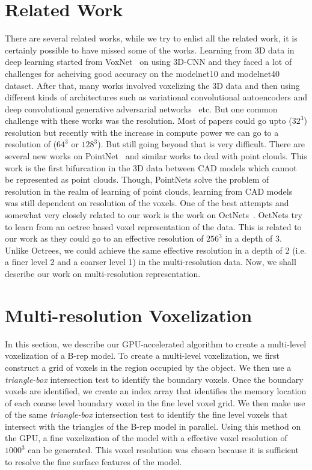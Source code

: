 \documentclass[10pt,letterpaper]{article}
\begin{document}
\section{Related Work}
\label{Sec:RelatedWork}

There are several related works, while we try to enlist all the related work, it is certainly possible to have missed some of the works. Learning from 3D data in deep learning started from VoxNet~\citep{7353481} on using 3D-CNN and they faced a lot of challenges for acheiving good accuracy on the modelnet10 and modelnet40 dataset. After that, many works involved voxelizing the 3D data and then using different kinds of architectures such as variational convolutional autoencoders and deep convolutional generative adversarial networks~\citep{DBLP:journals/corr/BrockLRW16,DBLP:journals/corr/0001ZXFT16} etc. But one common challenge with these works was the resolution. Most of papers could go upto ($32^3$) resolution but recently with the increase in compute power we can go to a resolution of ($64^3 \text{ or } 128^3$). But still going beyond that is very difficult. There are several new works on PointNet~\citep{qi2017pointnet++} and similar works to deal with point clouds. This work is the first bifurcation in the 3D data between CAD models which cannot be represented as point clouds. Though, PointNets solve the problem of resolution in the realm of learning of point clouds, learning from CAD models was still dependent on resolution of the voxels. One of the best attempts and somewhat very closely related to our work is the work on OctNets~\citep{tatarchenko2017octree,riegler2016octnet}. OctNets try to learn from an octree based voxel representation of the data. This is related to our work as they could go to an effective resolution of $256^3$ in a depth of 3. Unlike Octrees, we could achieve the same effective resolution in a depth of 2 (i.e. a finer level 2 and a coarser level 1) in the multi-resolution data. Now, we shall describe our work on multi-resolution representation.

\section{Multi-resolution Voxelization}
\label{Sec:Voxelization}

In this section, we describe our GPU-accelerated algorithm to create a multi-level voxelization of a B-rep model. To create a multi-level voxelization, we first construct a grid of voxels in the region occupied by the object. We then use a \emph{triangle-box} intersection test to identify the boundary voxels. Once the boundary voxels are identified, we create an index array that identifies the memory location of each coarse level boundary voxel in the fine level voxel grid. We then make use of the same  \emph{triangle-box} intersection test to identify the fine level voxels that intersect with the triangles of the B-rep model in parallel. Using this method on the GPU, a fine voxelization of the model with a effective voxel resolution of $1000^3$ can be generated. This voxel resolution was chosen because it is sufficient to resolve the fine surface features of the model.
\end{document}
